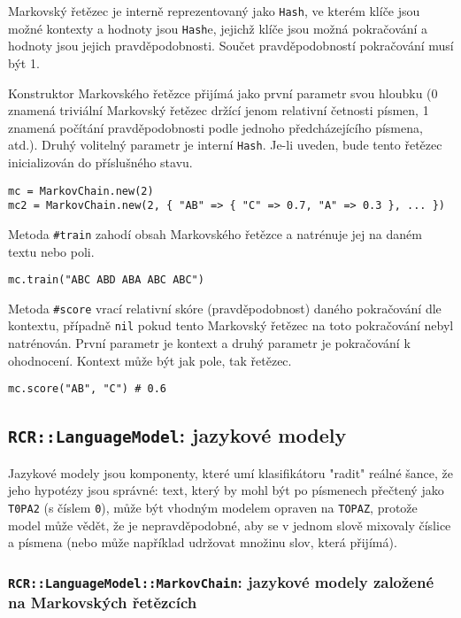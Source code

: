 \documentclass[a4paper]{article}
\begin{document}
Markovský řetězec je interně reprezentovaný jako \texttt{Hash}, ve kterém klíče
jsou možné kontexty a hodnoty jsou \texttt{Hash}e, jejichž klíče jsou možná
pokračování a hodnoty jsou jejich pravděpodobnosti. Součet pravděpodobností
pokračování musí být 1.

Konstruktor Markovského řetězce přijímá jako první parametr svou hloubku (0
znamená triviální Markovský řetězec držící jenom relativní četnosti písmen, 1
znamená počítání pravděpodobnosti podle jednoho předcházejícího písmena, atd.).
Druhý volitelný parametr je interní \texttt{Hash}. Je-li uveden, bude tento
řetězec inicializován do příslušného stavu.
\begin{lstlisting}
mc = MarkovChain.new(2)
mc2 = MarkovChain.new(2, { "AB" => { "C" => 0.7, "A" => 0.3 }, ... })
\end{lstlisting}

Metoda \texttt{\#train} zahodí obsah Markovského řetězce a natrénuje jej na
daném textu nebo poli.
\begin{lstlisting}
mc.train("ABC ABD ABA ABC ABC")
\end{lstlisting}

Metoda \texttt{\#score} vrací relativní skóre (pravděpodobnost) daného
pokračování dle kontextu, případně \texttt{nil} pokud tento Markovský řetězec
na toto pokračování nebyl natrénován. První parametr je kontext a druhý parametr
je pokračování k ohodnocení. Kontext může být jak pole, tak řetězec.
\begin{lstlisting}
mc.score("AB", "C") # 0.6
\end{lstlisting}


\subsection{\texttt{RCR::LanguageModel}: jazykové modely}
Jazykové modely jsou komponenty, které umí klasifikátoru "radit"
reálné šance, že jeho hypotézy jsou správné: text,
který by mohl být po písmenech přečtený jako \texttt{T0PA2} (s číslem
\texttt{0}), může být vhodným modelem opraven na \texttt{TOPAZ}, protože
model může vědět, že je nepravděpodobné, aby se v jednom slově mixovaly
číslice a písmena (nebo může například udržovat množinu slov, která
přijímá).


\subsubsection{\texttt{RCR::LanguageModel::MarkovChain}: jazykové modely
založené na Markovských řetězcích}
\end{document}
